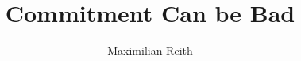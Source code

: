 \usepackage{graphicx, hyperref, tikz, pgfplots, subfiles, booktabs}
\usepackage[style = authoryear,maxcitenames = 2, hyperref=false]{biblatex}
\pgfplotsset{compat=1.18}    %
\usetikzlibrary{positioning, fit, backgrounds, patterns}


\newcommand{\bparam}{b}
\newcommand{\cparam}{c}

\title{Commitment Can be Bad}
\author{Maximilian Reith}
